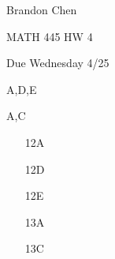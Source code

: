\documentclass[11pt]{article}
\begin{document}
\noindent Brandon Chen

\noindent MATH 445 HW 4

\noindent Due Wednesday 4/25

 A,D,E

 A,C

\begin{itemize}

	\item[12A]

	\item[12D]

	\item[12E]

	\item[13A]

	\item[13C]

\end{itemize}
\end{document}
